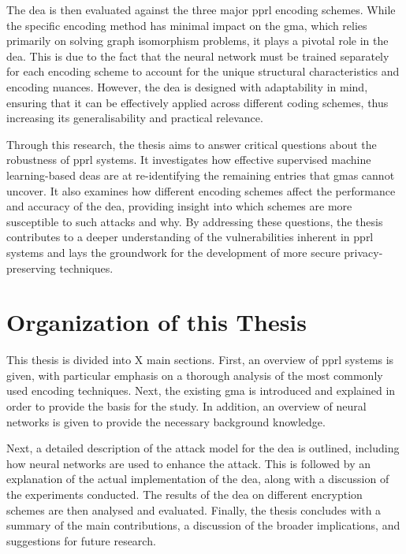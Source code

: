 The \ac{dea} is then evaluated against the three major \ac{pprl} encoding schemes. 
While the specific encoding method has minimal impact on the \ac{gma}, which relies primarily on solving graph isomorphism problems, it plays a pivotal role in the \ac{dea}. 
This is due to the fact that the neural network must be trained separately for each encoding scheme to account for the unique structural characteristics and encoding nuances. 
However, the \ac{dea} is designed with adaptability in mind, ensuring that it can be effectively applied across different coding schemes, thus increasing its generalisability and practical relevance.

Through this research, the thesis aims to answer critical questions about the robustness of \ac{pprl} systems. 
It investigates how effective supervised machine learning-based \ac{dea}s are at re-identifying the remaining entries that \ac{gma}s cannot uncover.
It also examines how different encoding schemes affect the performance and accuracy of the \ac{dea}, providing insight into which schemes are more susceptible to such attacks and why. 
By addressing these questions, the thesis contributes to a deeper understanding of the vulnerabilities inherent in \ac{pprl} systems and lays the groundwork for the development of more secure privacy-preserving techniques.




\section{Organization of this Thesis}  \label{sec:orga}

This thesis is divided into X main sections.
First, an overview of \ac{pprl} systems is given, with particular emphasis on a thorough analysis of the most commonly used encoding techniques.
Next, the existing \ac{gma} is introduced and explained in order to provide the basis for the study.
In addition, an overview of neural networks is given to provide the necessary background knowledge.

Next, a detailed description of the attack model for the \ac{dea} is outlined, including how neural networks are used to enhance the attack.
This is followed by an explanation of the actual implementation of the \ac{dea}, along with a discussion of the experiments conducted.
The results of the \ac{dea} on different encryption schemes are then analysed and evaluated.
Finally, the thesis concludes with a summary of the main contributions, a discussion of the broader implications, and suggestions for future research.